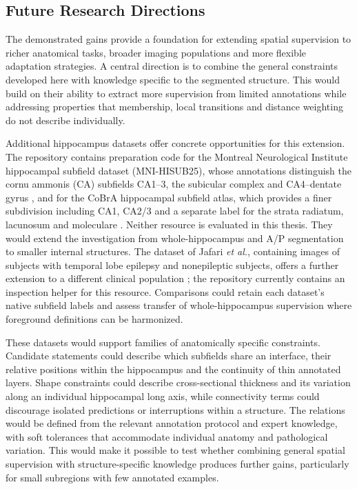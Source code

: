 \documentclass[12pt,a4paper]{article}
\begin{document}
\subsection{Future Research Directions}\label{sec:future-work}
\label{sec:pending-results}

The demonstrated gains provide a foundation for extending spatial
supervision to richer anatomical tasks, broader imaging populations and
more flexible adaptation strategies. A central direction is to combine
the general constraints developed here with knowledge specific to the
segmented structure. This would build on their ability to extract more
supervision from limited annotations while addressing properties that
membership, local transitions and distance weighting do not describe
individually.

Additional hippocampus datasets offer concrete opportunities for this
extension. The repository contains preparation code for the Montreal Neurological Institute hippocampal subfield dataset
(MNI-HISUB25), whose annotations distinguish the cornu ammonis
(CA) subfields CA1--3, the subicular complex and CA4--dentate
gyrus \cite{kulaga2015subfields}, and for the CoBrA hippocampal subfield
atlas, which provides a finer subdivision including CA1, CA2/3 and a
separate label for the strata radiatum, lacunosum and moleculare
\cite{winterburn2013atlas}. Neither resource is evaluated in this thesis.
They would extend the investigation from whole-hippocampus and A/P
segmentation to smaller internal structures. The dataset of Jafari \emph{et al.}, containing
images of subjects with temporal lobe epilepsy and nonepileptic subjects,
offers a further extension to a different clinical population
\cite{jafari2011dataset}; the repository currently contains an inspection
helper for this resource. Comparisons could retain each dataset's native
subfield labels and assess transfer of whole-hippocampus supervision where
foreground definitions can be harmonized.

These datasets would support families of anatomically specific
constraints. Candidate statements could describe which subfields share
an interface, their relative positions within the hippocampus and the
continuity of thin annotated layers. Shape constraints could describe
cross-sectional thickness and its variation along an individual
hippocampal long axis, while connectivity terms could discourage isolated
predictions or interruptions within a structure. The relations would be
defined from the relevant annotation protocol and expert knowledge, with
soft tolerances that accommodate individual anatomy and pathological
variation. This would make it possible to test whether combining general
spatial supervision with structure-specific knowledge produces further
gains, particularly for small subregions with few annotated examples.
\end{document}
